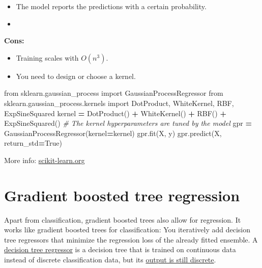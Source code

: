\documentclass[
]{book}
\newenvironment{Shaded}{\begin{snugshade}}{\end{snugshade}}
\newcommand{\CommentTok}[1]{\textcolor[rgb]{0.56,0.35,0.01}{\textit{#1}}}
\newcommand{\ImportTok}[1]{#1}
\newcommand{\NormalTok}[1]{#1}
\newcommand{\OperatorTok}[1]{\textcolor[rgb]{0.81,0.36,0.00}{\textbf{#1}}}
\newcommand{\VariableTok}[1]{\textcolor[rgb]{0.00,0.00,0.00}{#1}}
\begin{document}
\begin{itemize}
\item
  The model reports the predictions with a certain probability.
\item
\end{itemize}

\textbf{Cons:}

\begin{itemize}
\item
  Training scales with \(O(n^3)\).
\item
  You need to design or choose a kernel.
\end{itemize}

\begin{Shaded}
\begin{Highlighting}[]
\ImportTok{from}\NormalTok{ sklearn.gaussian\_process }\ImportTok{import}\NormalTok{ GaussianProcessRegressor}
\ImportTok{from}\NormalTok{ sklearn.gaussian\_process.kernels }\ImportTok{import}\NormalTok{ DotProduct, WhiteKernel, RBF, ExpSineSquared}
\NormalTok{kernel }\OperatorTok{=}\NormalTok{ DotProduct() }\OperatorTok{+}\NormalTok{ WhiteKernel() }\OperatorTok{+}\NormalTok{ RBF() }\OperatorTok{+}\NormalTok{ ExpSineSquared() }\CommentTok{\# The kernel hyperparameters are tuned by the model}
\NormalTok{gpr }\OperatorTok{=}\NormalTok{ GaussianProcessRegressor(kernel}\OperatorTok{=}\NormalTok{kernel)}
\NormalTok{gpr.fit(X, y)}
\NormalTok{gpr.predict(X, return\_std}\OperatorTok{=}\VariableTok{True}\NormalTok{)}
\end{Highlighting}
\end{Shaded}

More info:
\href{https://scikit-learn.org/stable/modules/generated/sklearn.gaussian_process.GaussianProcessRegressor.html}{scikit-learn.org}\\

\hypertarget{gradient-boosted-tree-regression}{%
\section{Gradient boosted tree regression}\label{gradient-boosted-tree-regression}}

Apart from classification, gradient boosted trees also allow for
regression. It works like gradient boosted trees for classification: You
iteratively add decision tree regressors that minimize the regression
loss of the already fitted ensemble. A \href{https://scikit-learn.org/stable/auto_examples/tree/plot_tree_regression.html}{decision tree
regressor}
is a decision tree that is trained on continuous data instead of
discrete classification data, but its \href{https://medium.com/analytics-vidhya/regression-trees-decision-tree-for-regression-machine-learning-e4d7525d8047}{output is still
discrete}.
\end{document}
